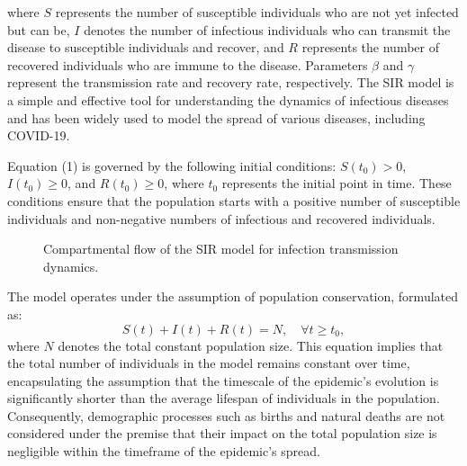 \documentclass[12pt]{article}
\begin{document}
where $S$ represents the number of susceptible individuals who are not yet infected but can be, $I$ denotes the number of infectious individuals who can transmit the disease to susceptible individuals and recover, and $R$ represents the number of recovered individuals who are immune to the disease. Parameters $\beta$ and $\gamma$ represent the transmission rate and recovery rate, respectively. The SIR model is a simple and effective tool for understanding the dynamics of infectious diseases and has been widely used to model the spread of various diseases, including COVID-19.

Equation (1) is governed by the following initial conditions: $S(t_0) > 0$, $I(t_0) \geq 0$, and $R(t_0) \geq 0$, where $t_0$ represents the initial point in time. These conditions ensure that the population starts with a positive number of susceptible individuals and non-negative numbers of infectious and recovered individuals. 

\begin{figure}[h!]
    \centering
    \caption{Compartmental flow of the SIR model for infection transmission dynamics.}
\end{figure}

The model operates under the assumption of population conservation, formulated as:
\begin{equation}
    S(t) + I(t) + R(t) = N, \quad \forall t \geq t_0,
\end{equation}
where $N$ denotes the total constant population size. This equation implies that the total number of individuals in the model remains constant over time, encapsulating the assumption that the timescale of the epidemic's evolution is significantly shorter than the average lifespan of individuals in the population. Consequently, demographic processes such as births and natural deaths are not considered under the premise that their impact on the total population size is negligible within the timeframe of the epidemic's spread.
\end{document}
